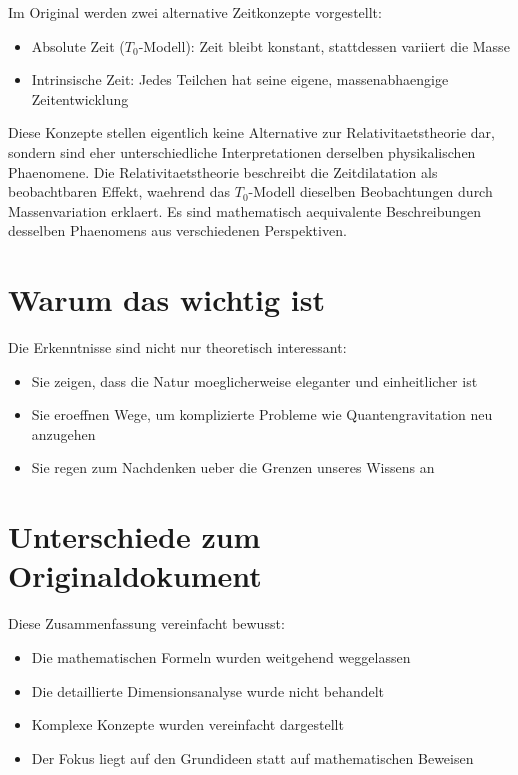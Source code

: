 \documentclass{article}
\begin{document}
	Im Original werden zwei alternative Zeitkonzepte vorgestellt:
	
	\begin{itemize}
		\item Absolute Zeit ($T_0$-Modell): Zeit bleibt konstant, stattdessen variiert die Masse
		\item Intrinsische Zeit: Jedes Teilchen hat seine eigene, massenabhaengige Zeitentwicklung
	\end{itemize}
	
	Diese Konzepte stellen eigentlich keine Alternative zur Relativitaetstheorie dar, sondern sind eher unterschiedliche Interpretationen derselben physikalischen Phaenomene. Die Relativitaetstheorie beschreibt die Zeitdilatation als beobachtbaren Effekt, waehrend das $T_0$-Modell dieselben Beobachtungen durch Massenvariation erklaert. Es sind mathematisch aequivalente Beschreibungen desselben Phaenomens aus verschiedenen Perspektiven.
	
	\section{Warum das wichtig ist}
	
	Die Erkenntnisse sind nicht nur theoretisch interessant:
	
	\begin{itemize}
		\item Sie zeigen, dass die Natur moeglicherweise eleganter und einheitlicher ist
		\item Sie eroeffnen Wege, um komplizierte Probleme wie Quantengravitation neu anzugehen
		\item Sie regen zum Nachdenken ueber die Grenzen unseres Wissens an
	\end{itemize}
	
	\section{Unterschiede zum Originaldokument}
	
	Diese Zusammenfassung vereinfacht bewusst:
	
	\begin{itemize}
		\item Die mathematischen Formeln wurden weitgehend weggelassen
		\item Die detaillierte Dimensionsanalyse wurde nicht behandelt
		\item Komplexe Konzepte wurden vereinfacht dargestellt
		\item Der Fokus liegt auf den Grundideen statt auf mathematischen Beweisen
	\end{itemize}
	
\end{document}
